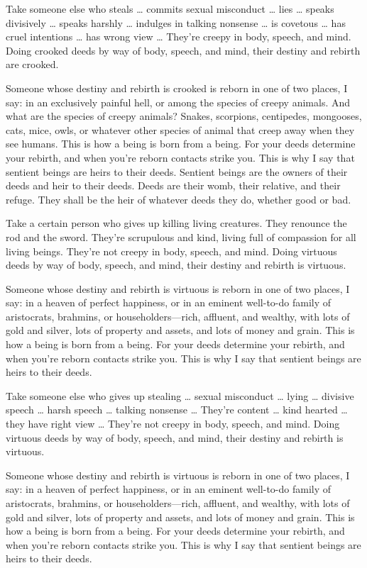 \documentclass[12pt,openany]{book}%
\begin{document}
Take someone else who steals … commits sexual misconduct … lies … speaks divisively … speaks harshly … indulges in talking nonsense … is covetous … has cruel intentions … has wrong view … They’re creepy in body, speech, and mind. Doing crooked deeds by way of body, speech, and mind, their destiny and rebirth are crooked. 

Someone whose destiny and rebirth is crooked is reborn in one of two places, I say: in an exclusively painful hell, or among the species of creepy animals. And what are the species of creepy animals? Snakes, scorpions, centipedes, mongooses, cats, mice, owls, or whatever other species of animal that creep away when they see humans. This is how a being is born from a being. For your deeds determine your rebirth, and when you’re reborn contacts strike you. This is why I say that sentient beings are heirs to their deeds. Sentient beings are the owners of their deeds and heir to their deeds. Deeds are their womb, their relative, and their refuge. They shall be the heir of whatever deeds they do, whether good or bad. 

Take a certain person who gives up killing living creatures. They renounce the rod and the sword. They’re scrupulous and kind, living full of compassion for all living beings. They’re not creepy in body, speech, and mind. Doing virtuous deeds by way of body, speech, and mind, their destiny and rebirth is virtuous. 

Someone whose destiny and rebirth is virtuous is reborn in one of two places, I say: in a heaven of perfect happiness, or in an eminent well-to-do family of aristocrats, brahmins, or householders—rich, affluent, and wealthy, with lots of gold and silver, lots of property and assets, and lots of money and grain. This is how a being is born from a being. For your deeds determine your rebirth, and when you’re reborn contacts strike you. This is why I say that sentient beings are heirs to their deeds. 

Take someone else who gives up stealing … sexual misconduct … lying … divisive speech … harsh speech … talking nonsense … They’re content … kind hearted … they have right view … They’re not creepy in body, speech, and mind. Doing virtuous deeds by way of body, speech, and mind, their destiny and rebirth is virtuous. 

Someone whose destiny and rebirth is virtuous is reborn in one of two places, I say: in a heaven of perfect happiness, or in an eminent well-to-do family of aristocrats, brahmins, or householders—rich, affluent, and wealthy, with lots of gold and silver, lots of property and assets, and lots of money and grain. This is how a being is born from a being. For your deeds determine your rebirth, and when you’re reborn contacts strike you. This is why I say that sentient beings are heirs to their deeds. 
\end{document}
